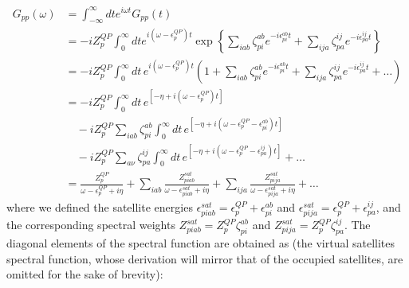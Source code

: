 \begin{align}
G_{pp}(\omega) & = \int_{-\infty}^{\infty} dt e^{i \omega t} G_{pp}(t)
\label{Gpp1}
\\
& = -i Z_p^{QP} \int_0^{\infty} dt e^{i(\omega - \epsilon_p^{QP}) t} \exp\left\{ \sum_{i a b} \zeta_{pi}^{ab} e^{-i\epsilon_{pi}^{ab} t} + \sum_{i j a} \zeta_{pa}^{ij} e^{-i\epsilon_{pa}^{ij} t} \right\}
\label{Gpp2}
\\
& = -i Z_p^{QP} \int_0^{\infty} dt\, e^{i(\omega - \epsilon_p^{QP}) t} \left(1 + \sum_{i a b} \zeta_{pi}^{ab} e^{-i\epsilon_{pi}^{ab} t} + \sum_{i j a} \zeta_{pa}^{ij} e^{-i\epsilon_{pa}^{ij} t} + \ldots \right) \\
&= -i Z_p^{QP} \int_0^{\infty} dt\, e^{[-\eta + i(\omega - \epsilon_p^{QP}) t]}\label{Gpp3} \\
&\quad - i Z_p^{QP} \sum_{iab} \zeta_{pi}^{ab} \int_0^{\infty} dt\, e^{[-\eta + i(\omega - \epsilon_p^{QP} - \epsilon_{pi}^{ab}) t]}\\
&\quad - i Z_p^{QP} \sum_{a\nu} \zeta_{pa}^{ij} \int_0^{\infty} dt\, e^{[-\eta + i(\omega - \epsilon_p^{QP} - \epsilon_{pa}^{ij}) t]} + \ldots\\
&= \frac{Z_p^{QP}}{\omega - \epsilon_p^{QP} + i\eta} + \sum_{i a b} \frac{Z_{piab}^{sat}}{\omega - \epsilon_{piab}^{sat} + i\eta} + \sum_{i j a} \frac{Z_{pija}^{sat}}{\omega - \epsilon_{pija}^{sat} + i\eta} + \ldots
\end{align}
where we defined the satellite energies $\epsilon_{piab}^{sat} = \epsilon_p^{QP} + \epsilon_{pi}^{ab}$ and $\epsilon_{pija}^{sat} = \epsilon_p^{QP} + \epsilon_{pa}^{ij}$, and the corresponding spectral weights $Z_{piab}^{sat} = Z_p^{QP} \zeta_{pi}^{ab}$ and $Z_{pija}^{sat} = Z_p^{QP} \zeta_{pa}^{ij}$.
The diagonal elements of the spectral function are obtained as (the virtual satellites spectral function, whose derivation will mirror that of the occupied satellites, are omitted for the sake of brevity):
